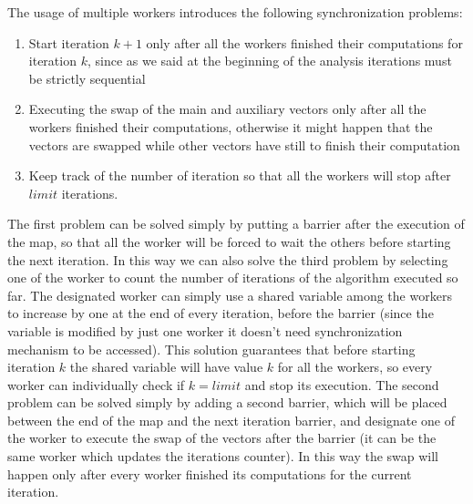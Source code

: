 \documentclass[12pt]{article}
\begin{document}
	The usage of multiple workers introduces the following synchronization problems:
	\begin{enumerate}
		\item Start iteration $k+1$ only after all the workers finished their computations for iteration $k$, since as we said at the beginning of the analysis iterations must be strictly sequential 
		\item Executing the swap of the main and auxiliary vectors only after all the workers finished their computations, otherwise it might happen that the vectors are swapped while other vectors have still to finish their computation
		\item Keep track of the number of iteration so that all the workers will stop after $limit$ iterations. 
	\end{enumerate}
	The first problem can be solved simply by putting a barrier after the execution of the map, so that all the worker will be forced to wait the others before starting the next iteration. In this way we can also solve the third problem by selecting one of the worker to count the number of iterations of the algorithm executed so far. The designated worker can simply use a shared variable among the workers to increase by one at the end of every iteration, before the barrier (since the variable is modified by just one worker it doesn't need synchronization mechanism to be accessed). This solution guarantees that before starting iteration $k$ the shared variable will have value $k$ for all the workers, so every worker can individually check if $k = limit$ and stop its execution. The second problem can be solved simply by adding a second barrier, which will be placed between the end of the map and the next iteration barrier, and designate one of the worker to execute the swap of the vectors after the barrier (it can be the same worker which updates the iterations counter). In this way the swap will happen only after every worker finished its computations for the current iteration. 
	
\end{document}
